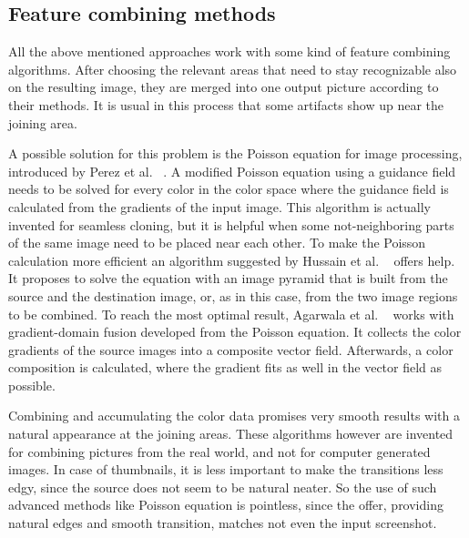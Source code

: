 \documentclass[draft,final]{vutinfth} %
\begin{document}
	\subsection{Feature combining methods}
	All the above mentioned approaches work with some kind of feature combining algorithms.
	After choosing the relevant areas that need to stay recognizable also on the resulting image, they are merged into one output picture according to their methods.
	It is usual in this process  that some artifacts show up near the joining area.\par 
	A possible solution for this problem is the Poisson equation for image processing, introduced by Perez et al. ~\cite{perez2003poisson}.
	A modified Poisson equation using a guidance field needs to be solved for every color in the color space where the guidance field is calculated from the gradients of the input image.
	This algorithm is actually invented for seamless cloning, but it is helpful when some not-neighboring parts of the same image need to be placed near each other.
	To make the Poisson calculation more efficient an algorithm suggested by Hussain et al. ~\cite{hussain2016efficient} offers help.
	It proposes to solve the equation with an image pyramid that is built from the source and the destination image, or, as in this case, from the two image regions to be combined.
	To reach the most optimal result, Agarwala et al. ~\cite{agarwala2004interactive} works with gradient-domain fusion developed from the Poisson equation.
	It collects the color gradients of the source images into a composite vector field.
	Afterwards,  a color composition is calculated, where the gradient fits as well in the vector field as possible. \par 
	Combining and accumulating the color data promises very smooth results with a natural appearance at the joining areas. 
	These algorithms however are invented for combining pictures from the real world, and not for computer generated images.
	In case of thumbnails, it is less important to make the transitions less edgy, since the source does not seem to be natural neater. 
	So the use of such advanced methods like Poisson equation is pointless, since the offer, providing natural edges and smooth transition, matches not even the input screenshot. 
	
	
	
\end{document}
